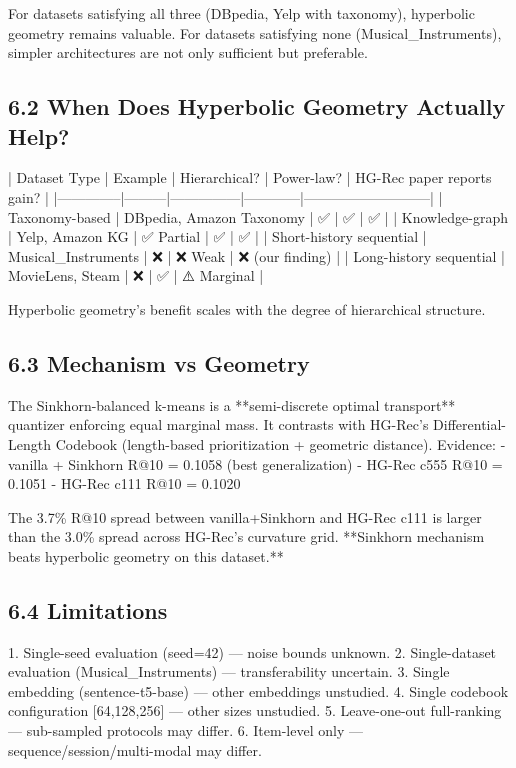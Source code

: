 \documentclass[11pt]{article}
\begin{document}
For datasets satisfying all three (DBpedia, Yelp with taxonomy), hyperbolic geometry remains valuable. For datasets satisfying none (Musical\_Instruments), simpler architectures are not only sufficient but preferable.


\subsection{6.2 When Does Hyperbolic Geometry Actually Help?}

| Dataset Type | Example | Hierarchical? | Power-law? | HG-Rec paper reports gain? |
|--------------|---------|---------------|------------|---------------------------|
| Taxonomy-based | DBpedia, Amazon Taxonomy | ✅ | ✅ | ✅ |
| Knowledge-graph | Yelp, Amazon KG | ✅ Partial | ✅ | ✅ |
| Short-history sequential | Musical\_Instruments | ❌ | ❌ Weak | ❌ (our finding) |
| Long-history sequential | MovieLens, Steam | ❌ | ✅ | ⚠️ Marginal |

Hyperbolic geometry's benefit scales with the degree of hierarchical structure.


\subsection{6.3 Mechanism vs Geometry}

The Sinkhorn-balanced k-means is a **semi-discrete optimal transport** quantizer enforcing equal marginal mass. It contrasts with HG-Rec's Differential-Length Codebook (length-based prioritization + geometric distance). Evidence:
- vanilla + Sinkhorn R@10 = 0.1058 (best generalization)
- HG-Rec c555 R@10 = 0.1051
- HG-Rec c111 R@10 = 0.1020

The 3.7\% R@10 spread between vanilla+Sinkhorn and HG-Rec c111 is larger than the 3.0\% spread across HG-Rec's curvature grid. **Sinkhorn mechanism beats hyperbolic geometry on this dataset.**


\subsection{6.4 Limitations}

1. Single-seed evaluation (seed=42) — noise bounds unknown.
2. Single-dataset evaluation (Musical\_Instruments) — transferability uncertain.
3. Single embedding (sentence-t5-base) — other embeddings unstudied.
4. Single codebook configuration [64,128,256] — other sizes unstudied.
5. Leave-one-out full-ranking — sub-sampled protocols may differ.
6. Item-level only — sequence/session/multi-modal may differ.
\end{document}
